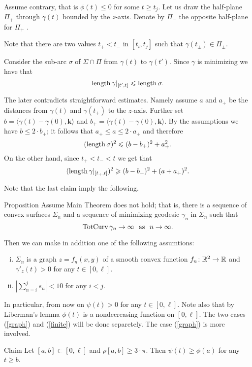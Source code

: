 \documentclass[a4paper,10pt]{amsart}
\begin{document}
Assume contrary, that is $\phi(t)\le 0$ for some $t\ge t_j$.
Let us draw the half-plane $\Pi_+$ through $\gamma(t)$ bounded by the $z$-axis.
Denote by $\Pi_-$ the opposite half-plane for $\Pi_+$ .

Note that there are two values $t_+<t_-$ in $[t_i,t_j]$
such that $\gamma(t_\pm)\in \Pi_\pm$.

Consider the sub-arc $\sigma$ 
of $\Sigma\cap\Pi$ from $\gamma(t)$
to $\gamma(t')$.
Since $\gamma$ is minimizing we have that 
\[\mathop{\rm length}\nolimits \gamma|_{[t',t]}\leqslant \mathop{\rm length}\nolimits\sigma.\]

The later contradicts straightforward estimates.
Namely assume 
$a$ and $a_+$ be the distances from $\gamma(t)$ and $\gamma(t_+)$ to the $z$-axis.
Further set $b=\langle \gamma(t)-\gamma(0),\bm{k}\rangle$ 
and 
$b_+=\langle \gamma(t)-\gamma(0),\bm{k}\rangle$.
By the assumptions we have $b\le 2\cdot b_+$;
it follows that  $a_+\le a\le 2\cdot a_+$
and therefore 
\[(\mathop{\rm length}\nolimits\sigma)^2\leqslant (b-b_+)^2+a_+^2.\]
On the other hand, since $t_+<t_-<t$ we get that 
\[(\mathop{\rm length}\nolimits\gamma|_{[t_+,t]})^2\geqslant (b-b_+)^2+(a+a_+)^2.\]
\qeds

Note that the last claim imply the following.

\begin{thm}{Proposition}\label{prop:graph}
Assume Main Theorem does not hold;
that is, there is a sequence of convex surfaces $\Sigma_n$
and a sequence of minimizing geodesic $\gamma_n$ in $\Sigma_n$ such that 
\[\tc \gamma_n\to\infty\ \ \text{as}\ \ n\to\infty.\]

Then we can make in addition one of the following assumtions:

\begin{enumerate}[(i)]
\item\label{graph} $\Sigma_n$ is a graph $z=f_n(x,y)$ of a smooth convex function $f_n\colon\mathbb{R}^2\to\mathbb{R}$
and $\gamma'_z(t)>0$ for any $t\in[0,\ell]$. 
\item\label{finite} $\left|\sum_{n=i}^js_n\right|<10$ for any $i<j$.
\end{enumerate} 
\end{thm}

In particular, from now on $\psi(t)>0$ for any $t\in[0,\ell]$.
Note also that by Liberman's lemma $\phi(t)$ is a nondecreasing function on $[0,\ell]$.
The two cases (\ref{graph}) and (\ref{finite}) will be done separetely.
The case (\ref{graph}) is more involved.

\begin{thm}{Claim}
Let $[a,b]\subset[0,\ell]$ and $\rho[a,b]\ge 3\cdot\pi$.
Then $\psi(t)\ge \phi(a)$ for any $t\ge b$.
\end{thm}
\end{document}
